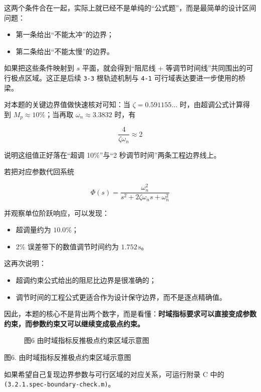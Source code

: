 \documentclass[
  11pt]{article}
\providecommand{\tightlist}{%
  \setlength{\itemsep}{0pt}\setlength{\parskip}{0pt}}
\begin{document}
这两个条件合在一起，实际上就已经不是单纯的``公式题''，而是最简单的设计区间问题：

\begin{itemize}
\tightlist
\item
  第一条给出``不能太冲''的边界；
\item
  第二条给出``不能太慢''的边界。
\end{itemize}

如果把这些条件映射到 \(s\) 平面，就会得到``阻尼线 +
等调节时间线''共同围出的可行极点区域。这正是后续 \texttt{3-3}
根轨迹机制与 \texttt{4-1} 可行域表达要进一步使用的桥梁。

对本题的关键边界值做快速核对可知：当 \(\zeta = 0.591155...\)
时，由超调公式计算得到 \(M_p \approx 10\%\)；当再取
\(\omega_n \approx 3.3832\) 时，有

\[
\frac{4}{\zeta\omega_n} \approx 2
\]

说明这组值正好落在``超调 10\%''与``2 秒调节时间''两条工程边界线上。

若把对应参数代回系统

\[
\Phi(s)=\frac{\omega_n^2}{s^2+2\zeta\omega_n s+\omega_n^2}
\]

并观察单位阶跃响应，可以发现：

\begin{itemize}
\tightlist
\item
  超调量约为 \(10.0\%\)；
\item
  2\% 误差带下的数值调节时间约为 \(1.752\,\text{s}\)。
\end{itemize}

这再次说明：

\begin{itemize}
\tightlist
\item
  超调约束公式给出的阻尼比边界是很准确的；
\item
  调节时间的工程公式更适合作为设计保守边界，而不是逐点精确值。
\end{itemize}

因此，本题的核心不是背出两个数字，而是看懂：\textbf{时域指标要求可以直接变成参数约束，而参数约束又可以继续变成极点约束。}

\begin{figure}
\centering

\caption{图6 由时域指标反推极点约束区域示意图}
\end{figure}

图6. 由时域指标反推极点约束区域示意图

如果希望自己复现边界参数与可行区域的对应关系，可运行附录 C 中的
\texttt{(3.2.1.spec-boundary-check.m)}。
\end{document}
